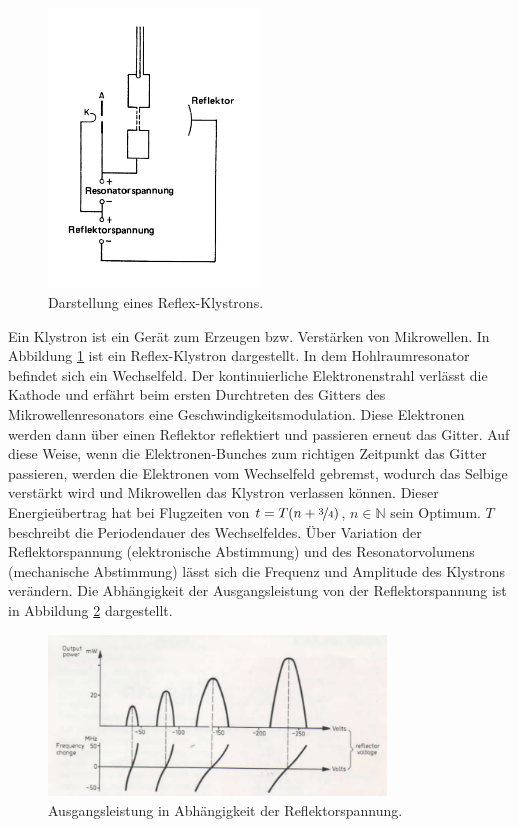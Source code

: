 \begin{figure}
    \centering
    \includegraphics[width=0.5\textwidth]{Bilder/reflex_klystron.PNG}
    \caption{Darstellung eines Reflex-Klystrons.\cite{Mikrowellen}}
    \label{fig:klystron}
\end{figure}

Ein Klystron ist ein Gerät zum Erzeugen bzw. Verstärken von Mikrowellen. In Abbildung \ref{fig:klystron} ist ein Reflex-Klystron dargestellt. In dem Hohlraumresonator befindet sich ein Wechselfeld. Der kontinuierliche Elektronenstrahl verlässt die Kathode und erfährt beim ersten Durchtreten des Gitters des Mikrowellenresonators eine Geschwindigkeitsmodulation. Diese Elektronen werden dann über einen Reflektor reflektiert und passieren erneut das Gitter. Auf diese Weise, wenn die Elektronen-Bunches zum richtigen Zeitpunkt das Gitter passieren, werden die Elektronen vom Wechselfeld gebremst, wodurch das Selbige verstärkt wird und Mikrowellen das Klystron verlassen können. Dieser Energieübertrag hat bei Flugzeiten von $t = T(n+\nicefrac{3}{4})$, $n \in \mathbb{N} $ sein Optimum. $T$ beschreibt die Periodendauer des Wechselfeldes. Über Variation der Reflektorspannung (elektronische Abstimmung) und des Resonatorvolumens (mechanische Abstimmung)
lässt sich die Frequenz und Amplitude des Klystrons verändern. Die Abhängigkeit der Ausgangsleistung von der Reflektorspannung ist in Abbildung \ref{fig:reflektor} dargestellt.

\begin{figure}
    \centering
    \includegraphics[width=0.8\textwidth]{Bilder/reflektor.PNG}
    \caption{Ausgangsleistung in Abhängigkeit der Reflektorspannung.\cite{Mikrowellen}}
    \label{fig:reflektor}
\end{figure}

